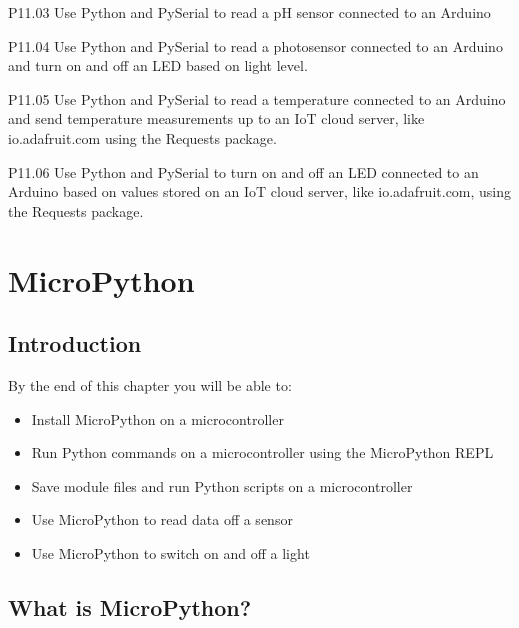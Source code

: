 \documentclass{book}
\begin{document}
P11.03 Use Python and PySerial to read a pH sensor connected to an
Arduino

P11.04 Use Python and PySerial to read a photosensor connected to an
Arduino and turn on and off an LED based on light level.

P11.05 Use Python and PySerial to read a temperature connected to an
Arduino and send temperature measurements up to an IoT cloud server,
like io.adafruit.com using the Requests package.

P11.06 Use Python and PySerial to turn on and off an LED connected to an
Arduino based on values stored on an IoT cloud server, like
io.adafruit.com, using the Requests package.
    




    
        \hypertarget{micropython}{%
\chapter{MicroPython}\label{micropython}}
    




    
        \hypertarget{introduction}{%
\section{Introduction}\label{introduction}}
    




    
        By the end of this chapter you will be able to:

\begin{itemize}
\item
  Install MicroPython on a microcontroller
\item
  Run Python commands on a microcontroller using the MicroPython REPL
\item
  Save module files and run Python scripts on a microcontroller
\item
  Use MicroPython to read data off a sensor
\item
  Use MicroPython to switch on and off a light
\end{itemize}
        \newpage

    




    
        \hypertarget{what-is-micropython}{%
\section{What is MicroPython?}\label{what-is-micropython}}
    
\end{document}
